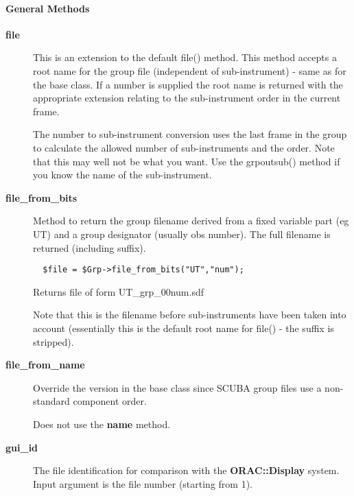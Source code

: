 \paragraph*{General Methods\label{ORAC::Group::SCUBA_General_Methods}}
\begin{description}

\item[{\textbf{file}}] \mbox{}

This is an extension to the default file() method.
This method accepts a root name for the group file
(independent of sub-instrument) - same as for the base
class. If a number is supplied the root name is returned
with the appropriate extension relating to the
sub-instrument order in the current frame.



The number to sub-instrument conversion uses the last frame in the
group to calculate the allowed number of sub-instruments and
the order. Note that this may well not be what you want.
Use the grpoutsub() method if you know the name of the sub-instrument.


\item[{\textbf{file\_from\_bits}}] \mbox{}

Method to return the group filename derived from a fixed
variable part (eg UT) and a group designator (usually obs
number). The full filename is returned (including suffix).

\begin{verbatim}
  $file = $Grp->file_from_bits("UT","num");
\end{verbatim}


Returns file of form UT\_grp\_00num.sdf



Note that this is the filename before sub-instruments
have been taken into account (essentially this is the
default root name for file() - the suffix is stripped).


\item[{\textbf{file\_from\_name}}] \mbox{}

Override the version in the base class since SCUBA group files
use a non-standard component order.



Does not use the \textbf{name} method.


\item[{\textbf{gui\_id}}] \mbox{}

The file identification for comparison with the \textbf{ORAC::Display}
system. Input argument is the file number (starting from 1).




\end{description}
